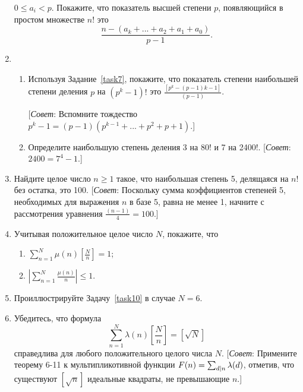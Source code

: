 \documentclass[11pt]{article}
\begin{document}
\begin{enumerate}
	$ 0\le a_{i}<p $. Покажите, что показатель высшей степени $ p $, появляющийся в простом множестве $ n! $ это
	\[\frac{n-\left( a_{k}+...+ a_{2}+a_{1}+a_{0}\right) }{p-1}.\]
	\item 
		\begin{enumerate}
			\label{task7}
			\item Используя Задание~\ref{task7}, покажите, что показатель степени наибольшей степени деления $ p $ на $ \left( p^{k}-1\right) ! $ это $ \frac{\left[ p^{k}-\left( p-1\right)k-1\right]   }{\left( p-1\right) } $. 
			
			[\textit{Совет}: Вспомните тождество $ p^{k}-1=\left( p-1\right) \left( p^{k-1}+...+p^{2}+p+1\right)  $.]
			\item Определите наибольшую степень деления 3 на 80! и 7 на 2400!. [\textit{Совет}: $2400=7^{4}-1$.]
		\end{enumerate}	
	\item Найдите целое число $ n\ge1 $ такое, что наибольшая степень 5, делящаяся на $ n! $ без остатка, это 100. [\textit{Совет}: Поскольку сумма коэффициентов степеней 5, необходимых для выражения $ n $ в базе 5, равна не менее 1, начните с рассмотрения уравнения $ \frac{\left( n-1\right) }{4}=100 $.]
	\item Учитывая положительное целое число $ N $, покажите, что 
		\begin{enumerate}
			\item $\sum\limits_{n=1}^{N}\mu(n)\left[ \frac{N}{n} \right] =1 $;
			\item $\left|\sum\limits_{n=1}^{N}\frac{\mu(n)}{n}\right| \le1 $.
		\end{enumerate}
	\label{task10}	
	\item Проиллюстрируйте Задачу~\ref{task10} в случае $ N=6 $.
	\item Убедитесь, что формула 
	\[\sum_{n=1}^{N}\lambda(n)\left[ \frac{N}{n}\right] =\left[ \sqrt{N}\right]\]
	справедлива для любого положительного целого числа $ N $. [\textit{Совет}: Примените теорему 6-11 к мультипликотивной функции $ F(n)=\sum_{\tiny d|n}\lambda(d) $, отметив, что существуют $ \left[ \sqrt{n}\right]  $ идеальные квадраты, не превышающие $ n $.]
\end{enumerate}
\end{document}
